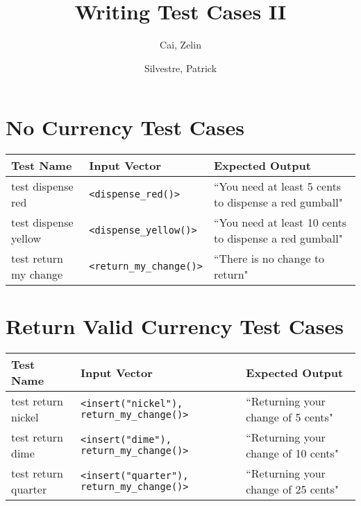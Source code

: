\documentclass[10pt,letterpaper]{article}
\title{Writing Test Cases II}
\author{
	Cai, Zelin\\
	\and
	Silvestre, Patrick\\
}
\date{}
\begin{document}
\maketitle
\section{No Currency Test Cases}
\begin{table}[!htb]
\begin{tabularx}{\textwidth}{XXX}
\toprule
Test Name &
    Input Vector &
    Expected Output \\ \midrule
test dispense red &
    \texttt{<dispense\_red()>} &
    ``You need at least 5 cents to dispense a red gumball" \\ \midrule
test dispense yellow &
    \texttt{<dispense\_yellow()>} &
    ``You need at least 10 cents to dispense a red gumball" \\ \midrule
test return my change &
    \texttt{<return\_my\_change()>} &
    ``There is no change to return" \\ \bottomrule
\end{tabularx}
\end{table}

\section{Return Valid Currency Test Cases}
\begin{table}[!htb]
\begin{tabularx}{\textwidth}{XXX}
\toprule
Test Name &
    Input Vector &
    Expected Output \\ \midrule
test return nickel &
    \texttt{<insert("nickel"), return\_my\_change()>} &
    ``Returning your change of 5 cents" \\ \midrule
test return dime &
    \texttt{<insert("dime"), return\_my\_change()>} &
    ``Returning your change of 10 cents" \\ \midrule
test return quarter &
    \texttt{<insert("quarter"), return\_my\_change()>} &
    ``Returning your change of 25 cents" \\ \bottomrule
\end{tabularx}
\end{table}
\end{document}
